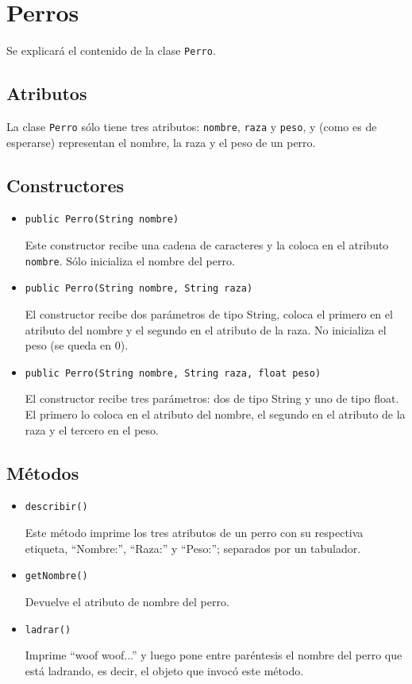 \documentclass{article}
\begin{document}
\section*{Perros}

Se explicará el contenido de la clase \texttt{Perro}.

\subsection*{Atributos}

La clase \texttt{Perro} sólo tiene tres atributos: \texttt{nombre}, \texttt{raza} y \texttt{peso}, y (como es de esperarse) representan el nombre, la raza y el peso de un perro.

\subsection*{Constructores}

\begin{itemize}
\item \texttt{public Perro(String nombre)}

Este constructor recibe una cadena de caracteres y la coloca en el atributo \texttt{nombre}. Sólo inicializa el nombre del perro.

\item \texttt{public Perro(String nombre, String raza)}

El constructor recibe dos parámetros de tipo String, coloca el primero en el atributo del nombre y el segundo en el atributo de la raza. No inicializa el peso (se queda en 0).

\item \texttt{public Perro(String nombre, String raza, float peso)}

El constructor recibe tres parámetros: dos de tipo String y uno de tipo float. El primero lo coloca en el atributo del nombre, el segundo en el atributo de la raza y el tercero en el peso.

\end{itemize}

\subsection*{Métodos}

\begin{itemize}
\item \texttt{describir()}

Este método imprime los tres atributos de un perro con su respectiva etiqueta, ``Nombre:'', ``Raza:'' y ``Peso:''; separados por un tabulador.

\item \texttt{getNombre()}

Devuelve el atributo de nombre del perro.

\item \texttt{ladrar()}

Imprime ``woof woof...'' y luego pone entre paréntesis el nombre del perro que está ladrando, es decir, el objeto que invocó este método.

\end{itemize}
\end{document}
